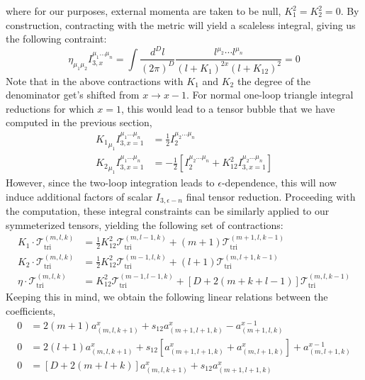 \documentclass[11pt,letter]{article}
\begin{document}
where for our purposes, external momenta are taken to be null, $K_1^2=K_2^2 = 0$. By construction, contracting with the metric will yield a scaleless integral, giving us the following contraint:
\begin{equation}
\eta_{\mu_1\mu_2}I^{\mu_1\dots \mu_n}_{3,x}= \int \frac{d^D l}{(2\pi)^D}\frac{l^{\mu_2}\cdots l^{\mu_n} }{(l+K_{1})^{2x}(l+K_{12})^2} = 0
\end{equation}
Note that in the above contractions with $K_1$ and $K_2$ the degree of the denominator get's shifted from $x\rightarrow x-1$. For normal one-loop triangle integral reductions for which $x=1$, this would lead to a tensor bubble that we have computed in the previous section,
\begin{align}
{K_1}_{\mu_1}I^{\mu_1\dots \mu_n}_{3,x=1}& = \frac{1}{2}I^{\mu_2\dots \mu_n}_{2}
\\
{K_2}_{\mu_1}I^{\mu_1\dots \mu_n}_{3,x=1}& = -\frac{1}{2}\left[I^{\mu_2\dots \mu_n}_{2}+K_{12}^2 I^{\mu_2\dots \mu_n}_{3,x=1}\right]
\end{align}
 However, since the two-loop integration leads to $\epsilon$-dependence, this will now induce additional factors of scalar $I_{3,\epsilon - n}$ final tensor reduction. Proceeding with the computation, these integral constraints can be similarly applied to our symmeterized tensors, yielding the following set of contractions:
\begin{align}
K_1\cdot \mathcal{T}^{(m,l,k)}_{\text{tri}} &=\frac{1}{2}K_{12}^2\mathcal{T}^{(m,l-1,k)}_{\text{tri}} + (m+1)\mathcal{T}^{(m+1,l,k-1)}_{\text{tri}} 
\\
K_2\cdot \mathcal{T}^{(m,l,k)}_{\text{tri}} &=\frac{1}{2}K_{12}^2\mathcal{T}^{(m-1,l,k)}_{\text{tri}} +(l+1)\mathcal{T}^{(m,l+1,k-1)}_{\text{tri}} 
\\
\eta\cdot  \mathcal{T}^{(m,l,k)}_{\text{tri}} &= K_{12}^2\mathcal{T}^{(m-1,l-1,k)}_{\text{tri}} +\left[D+2(m+k+l-1)\right]\mathcal{T}^{(m,l,k-1)}_{\text{tri}} 
\end{align}
Keeping this in mind, we obtain the following linear relations between the coefficients,
\begin{equation}
\begin{aligned}
0&=2(m+1)a_{(m,l,k+1)}^{x}+s_{12}a_{(m+1,l+1,k)}^{x}-a_{(m+1,l,k)}^{x-1}
\\
0&=2(l+1)a_{(m,l,k+1)}^{x}+s_{12}[a_{(m+1,l+1,k)}^{x}+a_{(m,l+1,k)}^{x}]+a_{(m,l+1,k)}^{x-1}
\\
0&=[D+2(m+l+k)]a_{(m,l,k+1)}^{x}+s_{12}a_{(m+1,l+1,k)}^{x}
\end{aligned}
\end{equation}
\end{document}
